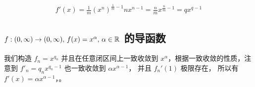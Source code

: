 \begin{align*}
    f'(x) = \frac{1}{m}(x^n)^{\frac{1}{m} - 1}n x^{n-1} = \frac{n}{m}x^{\frac{n}{m}-1} = qx^{q-1}
\end{align*}


\subsection{$f: (0, \infty) \to (0, \infty),\, f(x) = x^{\alpha},\, \alpha \in \mathbb{R}$ 的导函数}

我们构造 $f_n = x^{q_n}$ 并且在任意闭区间上一致收敛到 $x^\alpha$，根据一致收敛的性质，注意到 $f'_n = q_nx^{q_n -1}$ 也一致收敛到 $\alpha x^{\alpha - 1}$，
并且 $f_n'(1)$ 极限存在，
所以有 $f'(x) = \alpha x^{\alpha - 1}$，。